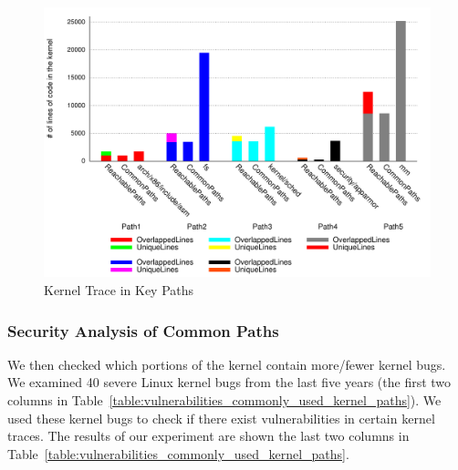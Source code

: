 \begin{figure}%
\centering
\includegraphics[width=1.0\columnwidth]{diagram/lind_ccs15_diagram_02.pdf}
\caption{Kernel Trace in Key Paths}
\label{fig:key_paths_trace}
\end{figure}


\subsubsection{Security Analysis of Common Paths}
We then checked which portions of the kernel contain more/fewer kernel bugs. 
We examined 40 severe Linux kernel bugs from the last five years (the first two columns in Table~\ref{table:vulnerabilities_commonly_used_kernel_paths}). 
We used these kernel bugs to check if there exist vulnerabilities in certain kernel traces.
The results of our experiment are shown the last two columns in Table~\ref{table:vulnerabilities_commonly_used_kernel_paths}.  

